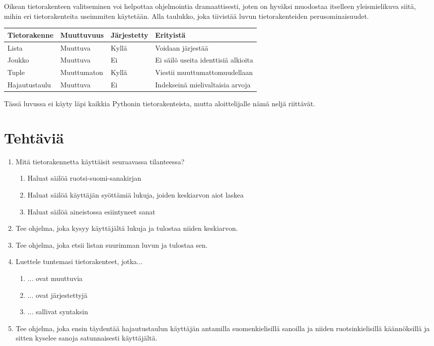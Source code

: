 Oikean tietorakenteen valitseminen voi helpottaa ohjelmointia dramaattisesti, joten on hyväksi muodostaa itselleen yleismielikuva siitä, mihin eri tietorakenteita useimmiten käytetään. Alla taulukko, joka tiivistää luvun tietorakenteiden perusominaisuudet.

\begin{tabularx}{\textwidth}{ |X|X|X|X| }
\hline
\textbf{Tietorakenne} & \textbf{Muuttuvuus} & \textbf{Järjestetty} & \textbf{Erityistä} \\ \hline
Lista & Muuttuva & Kyllä & Voidaan järjestää \\ \hline
Joukko & Muuttuva & Ei & Ei säilö useita identtisiä alkioita \\ \hline
Tuple & Muuttumaton & Kyllä & Viestii muuttumattomuudellaan \\ \hline
Hajautustaulu & Muuttuva & Ei & Indekseinä mielivaltaisia arvoja \\ \hline
\end{tabularx}

Tässä luvussa ei käyty läpi kaikkia Pythonin tietorakenteista, mutta aloittelijalle nämä neljä riittävät.

\section{Tehtäviä}

\begin{enumerate}[\thesection .1]

\item Mitä tietorakennetta käyttäisit seuraavassa tilanteessa?

\begin{enumerate}
\item Haluat säilöä ruotsi-suomi-sanakirjan
\item Haluat säilöä käyttäjän syöttämiä lukuja, joiden keskiarvon aiot laskea
\item Haluat säilöä aineistossa esiintyneet sanat
\end{enumerate}

\item Tee ohjelma, joka kysyy käyttäjältä lukuja ja tulostaa niiden keskiarvon.

\item Tee ohjelma, joka etsii listan suurimman luvun ja tulostaa sen.

\item Luettele tuntemasi tietorakenteet, jotka...

\begin{enumerate}
\item ... ovat muuttuvia
\item ... ovat järjestettyjä
\item ... sallivat syntaksin 
\end{enumerate}

\item Tee ohjelma, joka ensin täydentää hajautustaulun käyttäjän antamilla suomenkielisillä sanoilla ja niiden ruotsinkielisillä käännöksillä ja sitten kyselee sanoja satunnaisesti käyttäjältä.

\end{enumerate}
